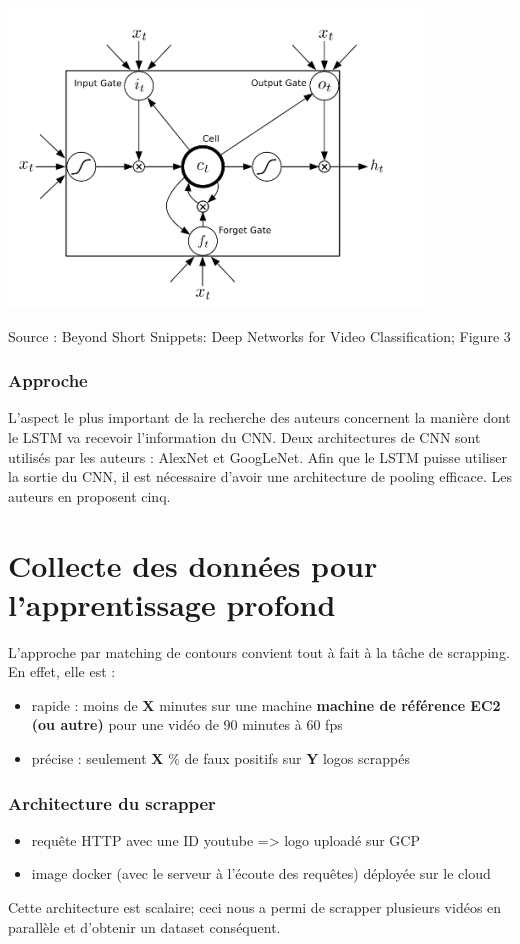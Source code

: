 \documentclass[11pt]{article}
\begin{document}
\begin{center}
\includegraphics[width=.9\linewidth]{cnn_lstm.PNG}
\end{center}
Source : Beyond Short Snippets: Deep Networks for Video Classification; Figure 3
\subsubsection{Approche}
\label{sec:orga290ccb}
L'aspect le plus important de la recherche des auteurs concernent la manière dont le LSTM va recevoir l'information du CNN.
Deux architectures de CNN sont utilisés par les auteurs : AlexNet et GoogLeNet.
Afin que le LSTM puisse utiliser la sortie du CNN, il est nécessaire d'avoir une architecture de pooling efficace.
Les auteurs en proposent cinq.

\section{Collecte des données pour l'apprentissage profond}
\label{sec:org7e77240}
L'approche par matching de contours convient tout à fait à la tâche de scrapping.
En effet, elle est :
\begin{itemize}
\item rapide : moins de \textbf{X} minutes sur une machine \textbf{machine de référence EC2 (ou autre)} pour une vidéo de 90 minutes à 60 fps
\item précise : seulement \textbf{X} \% de faux positifs sur \textbf{Y} logos scrappés
\end{itemize}

\subsubsection{Architecture du scrapper}
\label{sec:orgb0d3535}
\begin{itemize}
\item requête HTTP avec une ID youtube => logo uploadé sur GCP
\item image docker (avec le serveur à l'écoute des requêtes) déployée sur le cloud
\end{itemize}
Cette architecture est scalaire; ceci nous a permi de scrapper plusieurs vidéos en parallèle et d'obtenir un dataset conséquent.
\end{document}
